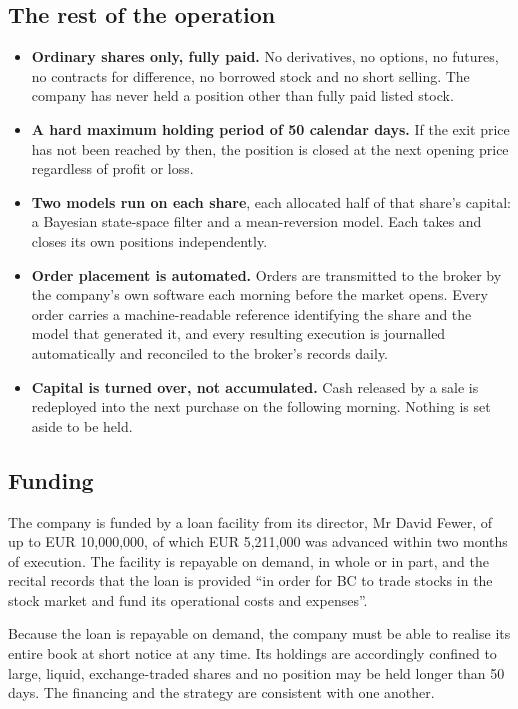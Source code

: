 \documentclass[11pt]{article}
\begin{document}
\subsection{The rest of the operation}

\begin{itemize}[leftmargin=1.4em,itemsep=0.2em]
\item \textbf{Ordinary shares only, fully paid.} No derivatives, no options, no futures, no
      contracts for difference, no borrowed stock and no short selling. The company has never held
      a position other than fully paid listed stock.
\item \textbf{A hard maximum holding period of 50 calendar days.} If the exit price has not been
      reached by then, the position is closed at the next opening price regardless of profit or
      loss.
\item \textbf{Two models run on each share}, each allocated half of that share's capital: a
      Bayesian state-space filter and a mean-reversion model. Each takes and closes its own
      positions independently.
\item \textbf{Order placement is automated.} Orders are transmitted to the broker by the company's
      own software each morning before the market opens. Every order carries a machine-readable
      reference identifying the share and the model that generated it, and every resulting
      execution is journalled automatically and reconciled to the broker's records daily.
\item \textbf{Capital is turned over, not accumulated.} Cash released by a sale is redeployed into
      the next purchase on the following morning. Nothing is set aside to be held.
\end{itemize}

\subsection{Funding}

The company is funded by a loan facility from its director, Mr David Fewer, of up to
EUR 10,000,000, of which EUR 5,211,000 was advanced within two months of execution. The facility
is repayable on demand, in whole or in part, and the recital records that the loan is provided
``in order for BC to trade stocks in the stock market and fund its operational costs and
expenses''.

Because the loan is repayable on demand, the company must be able to realise its entire book at
short notice at any time. Its holdings are accordingly confined to large, liquid, exchange-traded
shares and no position may be held longer than 50 days. The financing and the strategy are
consistent with one another.
\end{document}
